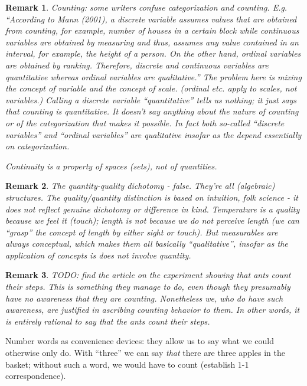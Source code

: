 \documentclass[11pt,twoside]{article}
\newtheorem{remark}{Remark}
\begin{document}
\begin{remark}
  Counting: some writers confuse categorization and counting.
  E.g. ``According to Mann (2001), a discrete variable assumes values
  that are obtained from counting, for example, number of houses in a
  certain block while continuous variables are obtained by measuring
  and thus, assumes any value contained in an interval, for example,
  the height of a person. On the other hand, ordinal variables are
  obtained by ranking. Therefore, discrete and continuous variables
  are quantitative whereas ordinal variables are qualitative.''
  \cite[3-4]{yusoff_generation_2014} The problem here is mixing the
  concept of variable and the concept of scale.  (ordinal etc. apply
  to scales, not variables.)  Calling a discrete variable
  ``quantitative'' tells us nothing; it just says that counting is
  quantitative.  It doesn't say anything about the nature of counting
  or of the categorization that makes it possible.  In fact both
  so-called ``discrete variables'' and ``ordinal variables'' are
  qualitative insofar as the depend essentially on categorization.

  Continuity is a property of spaces (sets), not of quantities.
\end{remark}

\begin{remark}
  The quantity-quality dichotomy - false.  They're all (algebraic)
  structures.  The quality/quantity distinction is based on intuition,
  folk science - it does not reflect genuine dichotomy or difference
  in kind.  Temperature is a quality because we feel it (touch);
  length is not because we do not perceive length (we can ``grasp''
  the concept of length by either sight or touch).  But measurables
  are always conceptual, which makes them all basically
  ``qualitative'', insofar as the application of concepts is does not
  involve quantity.
\end{remark}

\begin{remark}
  TODO: find the article on the experiment showing that ants count
  their steps.  This is something they manage to do, even though they
  presumably have no awareness \textit{that} they are counting.
  Nonetheless \textit{we}, who do have such awareness, are justified
  in ascribing counting behavior to them.  In other words, it is
  entirely rational to say \textit{that} the ants count their steps.
\end{remark}

Number words as convenience devices: they allow us to say what we
could otherwise only do.  With ``three'' we can say \textit{that}
there are three apples in the basket; without such a word, we would
have to count (establish 1-1 correspondence).
\end{document}
